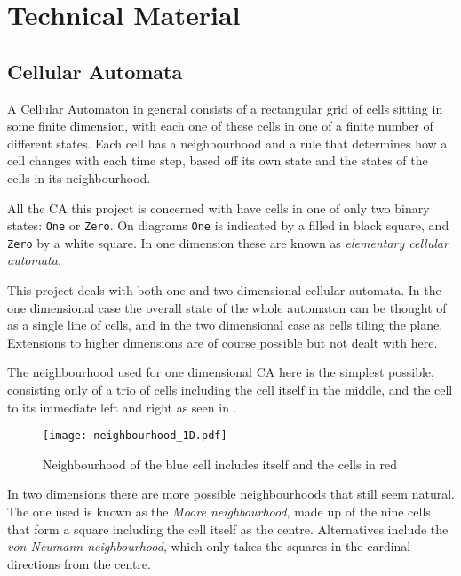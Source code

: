 \section{Technical Material}

\subsection{Cellular Automata}

A Cellular Automaton in general consists of a rectangular grid of cells sitting in some finite dimension,
with each one of these cells in one of a finite number of different states.
Each cell has a neighbourhood
and a rule that determines how a cell changes with each time step,
based off its own state and the states of the cells in its neighbourhood.

All the CA this project is concerned with have cells in one of only two binary states: \texttt{One} or \texttt{Zero}.
On diagrams \texttt{One} is indicated by a filled in black square,
and \texttt{Zero} by a white square.
In one dimension these are known as \emph{elementary cellular automata}.

This project deals with both one and two dimensional cellular automata.
In the one dimensional case the overall state of the whole automaton can be thought of as a single line of cells,
and in the two dimensional case as cells tiling the plane.
Extensions to higher dimensions are of course possible but not dealt with here.

The neighbourhood used for one dimensional CA here is the simplest possible,
consisting only of a trio of cells including the cell itself in the middle, and the cell to its immediate left and right as seen in .


\begin{figure}[h]
    \centering
    \texttt{[image: neighbourhood\_1D.pdf]}
    \caption{Neighbourhood of the {\color{blue} blue} cell includes itself and the cells in {\color{red} red}}
    \label{fig:nbhd_1D}
\end{figure}

In two dimensions there are more possible neighbourhoods that still seem natural.
The one used  is known as the \emph{Moore neighbourhood},
made up of the nine cells that form a square including the cell itself as the centre.
Alternatives include the \emph{von Neumann neighbourhood},
which only takes the squares in the cardinal directions from the centre.


